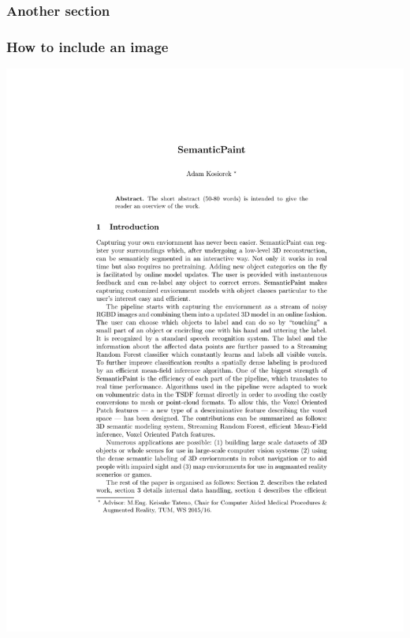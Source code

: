 \documentclass[mathserif]{beamer}
\begin{document}
\begin{frame}
\frametitle{Another section}
\end{frame}

\begin{frame}
\frametitle{How to include an image}
\begin{center}
\includegraphics[width=0.3\linewidth]{template}
\end{center}
\end{frame}
\end{document}
